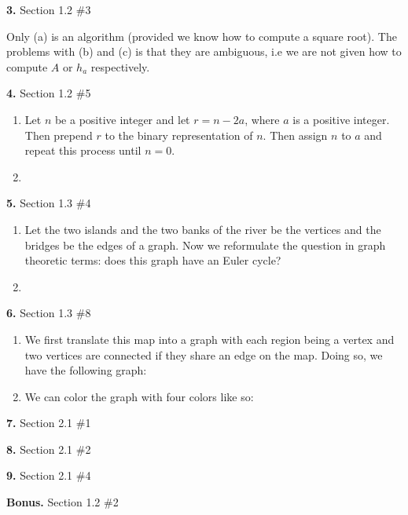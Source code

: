 \documentclass[letterpaper, 11pt]{article}
\newcommand{\hwnumber}[3]{\medskip \noindent\textbf{#1.} Section #2 \##3 \smallskip}
\begin{document}
\newpage

\hwnumber{3}{1.2}{3}

Only (a) is an algorithm (provided we know how to compute a square root). The
problems with (b) and (c) is that they are ambiguous, i.e we are not given how
to compute $A$ or $h_a$ respectively. 

\hwnumber{4}{1.2}{5}

\begin{enumerate}[label = (\alph*)]
  \item Let $n$ be a positive integer and let $r = n - 2a$, where $a$ is 
    a positive integer. Then prepend $r$ to the binary representation of 
    $n$. Then assign $n$ to $a$ and repeat this process until $n = 0$. 

  \item 

\end{enumerate}


\hwnumber{5}{1.3}{4}

\begin{enumerate}[label = (\alph*)]
  \item Let the two islands and the two banks of the river be the vertices and the
    bridges be the edges of a graph. Now we reformulate the question in graph
    theoretic terms: does this graph have an Euler cycle?

   \item 
\end{enumerate}



\hwnumber{6}{1.3}{8}

\begin{enumerate}[label = (\alph*)]
  \item We first translate this map into a graph with each region being a vertex
    and two vertices are connected if they share an edge on the map. Doing so,
    we have the following graph:

  \item We can color the graph with four colors like so:

\end{enumerate}


\hwnumber{7}{2.1}{1}


\hwnumber{8}{2.1}{2}


\hwnumber{9}{2.1}{4}


\hwnumber{Bonus}{1.2}{2}
\end{document}
